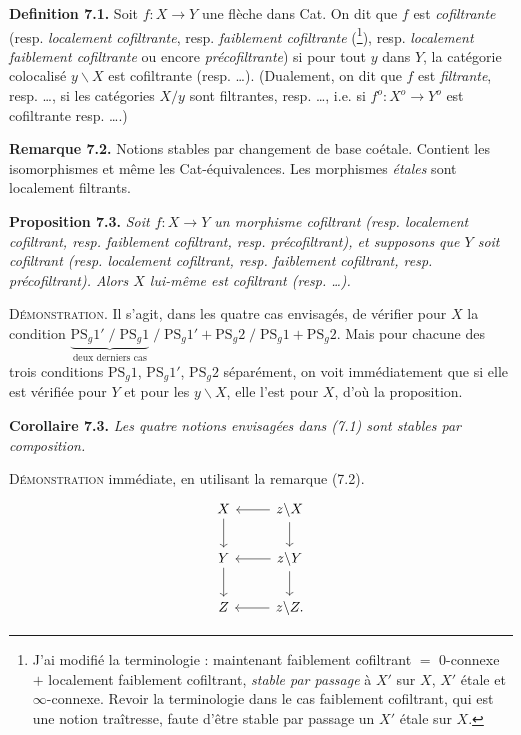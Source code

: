 \documentclass[11pt]{article}
\def\dcprintedpending{}
\newcommand{\msp}[1]{\marginpar{\footnotesize\raggedright
  \ifx\dcprintedpending\empty\else p.~\dcprintedpending\par\fi
  [#1]}\gdef\dcprintedpending{}}
\begin{document}
\textbf{Definition 7.1.} Soit $f : X \longrightarrow Y$ une flèche dans Cat. On dit que $f$ est \textit{cofiltrante} (resp. \textit{localement cofiltrante}, resp. \textit{faiblement cofiltrante} (\footnote[64]{J'ai modifié la terminologie : maintenant faiblement cofiltrant $=$ 0-connexe $+$ localement faiblement cofiltrant, \textit{stable par passage} à $X'$ sur $X$, $X'$ étale et $\infty$-connexe. Revoir la terminologie dans le cas faiblement cofiltrant, qui est une notion traîtresse, faute d'être stable par passage un $X'$ étale sur $X$.}), resp. \textit{localement faiblement cofiltrante} ou encore \textit{précofiltrante}) si pour tout $y$ dans $Y$, la catégorie colocalisé $y\backslash X$ est cofiltrante (resp. \dots). (Dualement, on dit que $f$ est \textit{filtrante}, resp. \dots, si les catégories $X/y$ sont filtrantes, resp. \dots, i.e. si $f^o : X^o \longrightarrow Y^o$ est cofiltrante resp. \dots.) %

\textbf{Remarque 7.2.} Notions stables par changement de base coétale. Contient les isomorphismes et même les Cat-équivalences. Les morphismes \textit{étales} sont localement filtrants.

\textbf{Proposition 7.3.} \textit{Soit $f : X \longrightarrow Y$ un morphisme cofiltrant (resp. localement cofiltrant, resp. faiblement cofiltrant, resp. précofiltrant), et supposons que $Y$ soit cofiltrant (resp. localement cofiltrant, resp. faiblement cofiltrant, resp. précofiltrant). Alors $X$ lui-même est cofiltrant (resp. \dots).}

\textsc{Démonstration}. Il s'agit, dans les quatre cas envisagés, de vérifier pour $X$ la condition $\underbrace{\mathrm{PS}_g1' \;/\; \mathrm{PS}_g1}_{\text{deux derniers cas}} \;/\; \mathrm{PS}_g1' + \mathrm{PS}_g2 \;/\; \mathrm{PS}_g1 + \mathrm{PS}_g2$. Mais \msp{page 91} pour chacune des trois conditions $\mathrm{PS}_g1$, $\mathrm{PS}_g1'$, $\mathrm{PS}_g2$ séparément, on voit immédiatement que si elle est vérifiée pour $Y$ et pour les $y\backslash X$, elle l'est pour $X$, d'où la proposition.

\textbf{Corollaire 7.3.} \textit{Les quatre notions envisagées dans (7.1) sont stables par composition.}

\textsc{Démonstration} immédiate, en utilisant la remarque (7.2).
\[
\begin{tikzcd}
X \arrow[d] & z\backslash X \arrow[l] \arrow[d] \\
Y \arrow[d] & z\backslash Y \arrow[l] \arrow[d] \\
Z & z\backslash Z. \arrow[l]
\end{tikzcd}
\]
\end{document}
